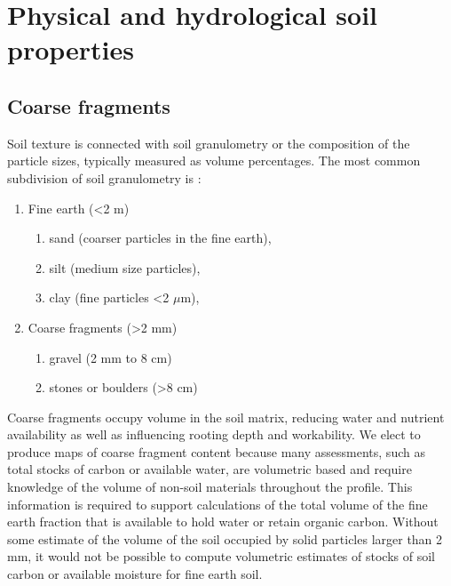 \documentclass[11pt]{krantz}
\theoremstyle{definition}
\theoremstyle{definition}
\theoremstyle{definition}
\theoremstyle{remark}
\begin{document}
\hypertarget{physical-and-hydrological-soil-properties}{%
\section{Physical and hydrological soil
properties}\label{physical-and-hydrological-soil-properties}}

\hypertarget{coarse-fragments}{%
\subsection{Coarse fragments}\label{coarse-fragments}}

Soil texture is connected with soil granulometry or the composition of
the particle sizes, typically measured as volume percentages. The most
common subdivision of soil granulometry is \citep{Shirazi2001SSSAJ}:

\begin{enumerate}
\def\labelenumi{\arabic{enumi}.}
\item
  Fine earth (\textless{}2 m)

  \begin{enumerate}
  \def\labelenumii{\arabic{enumii}.}
  \item
    sand (coarser particles in the fine earth),
  \item
    silt (medium size particles),
  \item
    clay (fine particles \textless{}2 \(\mu\)m),
  \end{enumerate}
\item
  Coarse fragments (\textgreater{}2 mm)

  \begin{enumerate}
  \def\labelenumii{\arabic{enumii}.}
  \item
    gravel (2 mm to 8 cm)
  \item
    stones or boulders (\textgreater{}8 cm)
  \end{enumerate}
\end{enumerate}

Coarse fragments occupy volume in the soil matrix, reducing water and
nutrient availability as well as influencing rooting depth and
workability. We elect to produce maps of coarse fragment content because
many assessments, such as total stocks of carbon or available water, are
volumetric based and require knowledge of the volume of non-soil
materials throughout the profile. This information is required to
support calculations of the total volume of the fine earth fraction that
is available to hold water or retain organic carbon. Without some
estimate of the volume of the soil occupied by solid particles larger
than 2 mm, it would not be possible to compute volumetric estimates of
stocks of soil carbon or available moisture for fine earth soil.
\end{document}
